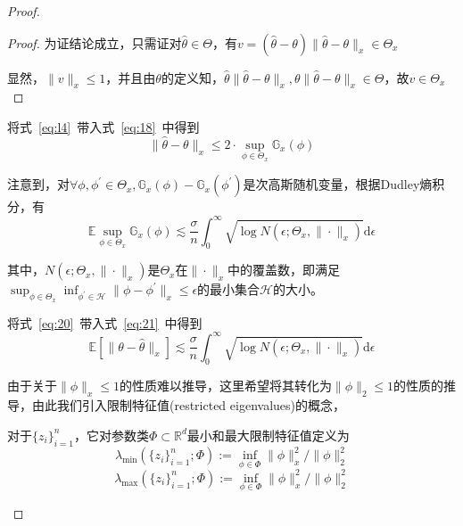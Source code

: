\begin{proof}
\begin{lemma}
\end{lemma}
\begin{proof}
为证结论成立，只需证对$\hat{\theta} \in \Theta$，有$v = (\hat{\theta} - \theta)\|\hat{\theta}-\theta\|_x \in \Theta_x$
\par
显然，$\|v\|_x \leq 1$，并且由$\theta$的定义知，$\hat{\theta}\|\hat{\theta}-\theta\|_x, \theta\|\hat{\theta}-\theta\|_x \in \Theta$，故$v\in \Theta_x$
\end{proof}
\par
将式~\ref{eq:l4}~带入式~\ref{eq:18}~中得到
\begin{equation}\label{eq:20}
\|\hat{\theta} - \theta\|_x \leq 2\cdot \sup_{\phi\in \Theta_x}\mathbb{G}_x(\phi)
\end{equation}
\par
注意到，对$\forall \phi, \phi^\prime \in \Theta_x, \mathbb{G}_x(\phi) - \mathbb{G}_x(\phi^\prime)$是次高斯随机变量，根据Dudley熵积分，有
\begin{equation}\label{eq:21}
\mathbb{E}\sup_{\phi \in \Theta_x} \mathbb{G}_x(\phi) \lesssim \frac{\sigma}{n}\int_0^\infty \sqrt{\log N(\epsilon;\Theta_x,\|\cdot\|_x)} \mathrm{d}\epsilon
\end{equation}
\par
其中，$N(\epsilon;\Theta_x,\|\cdot\|_x)$是$\Theta_x$在$\|\cdot\|_x$中的覆盖数，即满足$\sup_{\phi\in\Theta_x}\inf_{\phi^\prime \in \mathcal{H}}\|\phi-\phi^\prime\|_x \leq \epsilon$的最小集合$\mathcal{H}$的大小。
\par
将式~\ref{eq:20}~带入式~\ref{eq:21}~中得到
\begin{equation}\label{eq:22}
\mathbb{E} [\|\theta-\hat{\theta}\|_x] \lesssim \frac{\sigma}{n}\int_0^\infty \sqrt{\log N(\epsilon;\Theta_x,\|\cdot\|_x)} \mathrm{d}\epsilon
\end{equation}

\par
由于关于$\|\phi\|_x\leq 1$的性质难以推导，这里希望将其转化为$\|\phi\|_2 \leq 1$的性质的推导，由此我们引入限制特征值(restricted eigenvalues)的概念，
\begin{definition}
对于$\{z_i\}_{i=1}^n$，它对参数类$\Phi \subset \mathbb{R}^d$最小和最大限制特征值定义为
\begin{equation}\label{eq:23}
\lambda_{\min}(\{z_i\}_{i=1}^n; \Phi) := \inf_{\phi\in \Phi}\|\phi\|_x^2/\|\phi\|_2^2
\end{equation}
\begin{equation}\label{eq:24}
\lambda_{\max}(\{z_i\}_{i=1}^n; \Phi) := \inf_{\phi\in \Phi}\|\phi\|_x^2/\|\phi\|_2^2
\end{equation}
\end{definition}


\end{proof}
